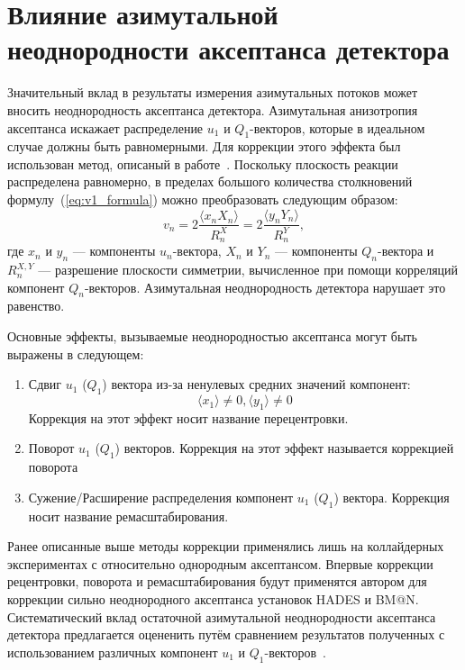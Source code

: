 \section{Влияние азимутальной неоднородности аксептанса детектора}

Значительный вклад в результаты измерения азимутальных потоков может вносить неоднородность аксептанса детектора. 
Азимутальная анизотропия аксептанса искажает распределение $u_1$  и $Q_1$-векторов, которые в идеальном случае должны быть равномерными. 
Для коррекции этого эффекта был использован метод, описаный в работе~\cite{Selyuzhenkov:2007zi}.
Поскольку плоскость реакции распределена равномерно, в пределах большого количества столкновений формулу~(\ref{eq:v1_formula}) можно преобразовать следующим образом:
%
\begin{equation}
    v_n =  2\frac{ \langle x_n X_n \rangle }{R_n^X} = 2\frac{ \langle y_n Y_n \rangle }{R_n^Y},
    \label{eq:v1_formula}
\end{equation}
%
где $x_n$ и $y_n$ --- компоненты $u_n$-вектора, $X_n$ и $Y_n$ --- компоненты $Q_n$-вектора и $R_n^{X,Y}$ --- разрешение плоскости симметрии, вычисленное при помощи корреляций компонент $Q_n$-векторов.
Азимутальная неоднородность детектора нарушает это равенство.

Основные эффекты, вызываемые неоднородностью аксептанса могут быть выражены в следующем:
\begin{enumerate}
    \item Сдвиг $u_1$ ($Q_1$) вектора из-за ненулевых средних значений компонент:
    \begin{equation}
        \langle x_1 \rangle \ne 0, \langle y_1 \rangle \ne 0
    \end{equation}
    Коррекция на этот эффект носит название перецентровки.
    \item Поворот $u_1$ ($Q_1$) векторов. Коррекция на этот эффект называется коррекцией поворота
    \item Сужение/Расширение распределения компонент $u_1$ ($Q_1$) вектора. Коррекция носит название ремасштабирования.
\end{enumerate}

Ранее описанные выше методы коррекции применялись лишь на коллайдерных экспериментах с относительно однородным аксептансом. 
Впервые коррекции рецентровки, поворота и ремасштабирования будут применятся автором для коррекции сильно неоднородного аксептанса установок HADES и BM@N.
Систематический вклад остаточной азимутальной неоднородности аксептанса детектора предлагается оцененить путём сравнением результатов полученных с использованием различных компонент $u_1$ и $Q_1$-векторов~\cite{Mamaev:2020qom,Mamaev:2023yhz}. 

